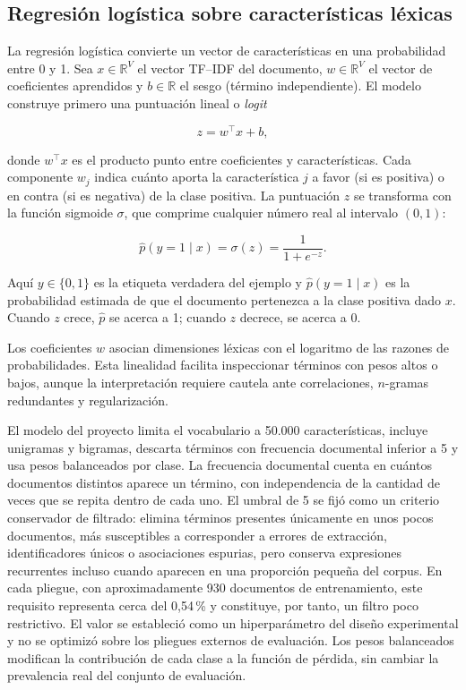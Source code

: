 \subsection{Regresión logística sobre características léxicas}

La regresión logística convierte un vector de características en una probabilidad entre 0 y 1. Sea $x\in\mathbb{R}^{V}$ el vector TF--IDF del documento, $w\in\mathbb{R}^{V}$ el vector de coeficientes aprendidos y $b\in\mathbb{R}$ el sesgo (término independiente). El modelo construye primero una puntuación lineal o \emph{logit}

\begin{equation}
  z=w^\top x+b,
\end{equation}

donde $w^\top x$ es el producto punto entre coeficientes y características. Cada componente $w_j$ indica cuánto aporta la característica $j$ a favor (si es positiva) o en contra (si es negativa) de la clase positiva. La puntuación $z$ se transforma con la función sigmoide $\sigma$, que comprime cualquier número real al intervalo $(0,1)$:

\begin{equation}
  \hat p(y=1\mid x)=\sigma(z)=\frac{1}{1+e^{-z}}.
\end{equation}

Aquí $y\in\{0,1\}$ es la etiqueta verdadera del ejemplo y $\hat p(y=1\mid x)$ es la probabilidad estimada de que el documento pertenezca a la clase positiva dado $x$. Cuando $z$ crece, $\hat p$ se acerca a 1; cuando $z$ decrece, se acerca a 0.

Los coeficientes $w$ asocian dimensiones léxicas con el logaritmo de las razones de probabilidades. Esta linealidad facilita inspeccionar términos con pesos altos o bajos, aunque la interpretación requiere cautela ante correlaciones, $n$-gramas redundantes y regularización.

El modelo del proyecto limita el vocabulario a 50.000 características, incluye unigramas y bigramas, descarta términos con frecuencia documental inferior a 5 y usa pesos balanceados por clase. La frecuencia documental cuenta en cuántos documentos distintos aparece un término, con independencia de la cantidad de veces que se repita dentro de cada uno. El umbral de 5 se fijó como un criterio conservador de filtrado: elimina términos presentes únicamente en unos pocos documentos, más susceptibles a corresponder a errores de extracción, identificadores únicos o asociaciones espurias, pero conserva expresiones recurrentes incluso cuando aparecen en una proporción pequeña del corpus. En cada pliegue, con aproximadamente 930 documentos de entrenamiento, este requisito representa cerca del 0,54\,\% y constituye, por tanto, un filtro poco restrictivo. El valor se estableció como un hiperparámetro del diseño experimental y no se optimizó sobre los pliegues externos de evaluación. Los pesos balanceados modifican la contribución de cada clase a la función de pérdida, sin cambiar la prevalencia real del conjunto de evaluación.

